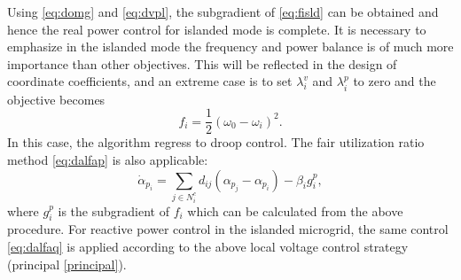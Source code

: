 \documentclass{article}
\begin{document}
Using \eqref{eq:domg} and \eqref{eq:dvpl}, the subgradient of \eqref{eq:fisld} can be obtained and hence the real power control for islanded mode is complete. It is necessary to emphasize in the islanded mode the frequency and power balance is of much more importance than other objectives. This will be
reflected in the design of coordinate coefficients, and an extreme case is to set $\lambda^{v}_i$ and $\lambda^{p}_i$ to zero and the objective becomes
\begin{equation}
    f_i =\frac{1}{2}(\omega_0-\omega_{i})^2.   
\end{equation}
In this case, the algorithm regress to droop control. The fair utilization ratio method \eqref{eq:dalfap} is also applicable:
\begin{equation}
    \dot \alpha_{p_i} = \sum_{j \in N_i^c}d_{ij} (\alpha_{p_j}-\alpha_{p_i}) - \beta_i g^p_{i},  \label{eq:dalfapf}
\end{equation}
where $g^p_{i}$ is the subgradient of $f_i$ which can be calculated from the above procedure. For reactive power control in the islanded microgrid, the same control \eqref{eq:dalfaq} is applied according to the above local voltage control strategy (principal \ref{principal}).
\end{document}
